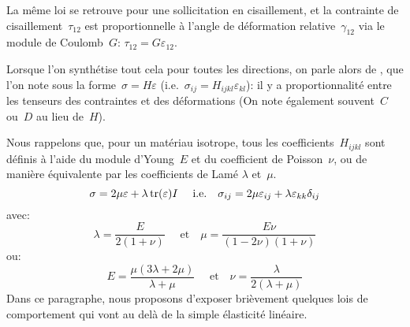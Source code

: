 La même loi se retrouve pour une sollicitation en cisaillement, et la contrainte de cisaillement~$\tau_{12}$
est proportionnelle à l'angle de déformation relative~$\gamma_{12}$ via le module de
Coulomb~$G$:
$\tau_{12}=G\varepsilon_{12}$.

Lorsque l'on synthétise tout cela pour toutes les directions, on parle alors de ,
que l'on note sous la forme~$\sigma=H\varepsilon$ (i.e.~$\sigma_{ij}=H_{ijkl}\varepsilon_{kl}$):
il y a proportionnalité entre les tenseurs des contraintes et des déformations (On note également
souvent~$C$ ou~$D$ au lieu de~$H$).

\medskip
Nous rappelons que, pour un matériau isotrope, tous les coefficients~$H_{ijkl}$ sont définis
à l'aide du module d'Young~$E$
et du coefficient de Poisson~$\nu$,
ou de manière équivalente par les coefficients de Lamé
$\lambda$ et~$\mu$.
\begin{equation}\sigma = 2\mu\varepsilon+\lambda \operatorname{tr}(\varepsilon)I \quad \text{ i.e.} \quad
\sigma_{ij}=2\mu\varepsilon_{ij}+\lambda\varepsilon_{kk}\delta_{ij}\end{equation}
avec:
\begin{equation}\lambda=\dfrac{E}{2(1+\nu)} \quad \text{ et} \quad \mu=\dfrac{E\nu}{(1-2\nu)(1+\nu)} \end{equation}
ou:
\begin{equation}E=\dfrac{\mu(3\lambda+2\mu)}{\lambda+\mu} \quad\text{ et}\quad
\nu=\dfrac{\lambda}{2(\lambda+\mu)} \end{equation}
\medskipvm
Dans ce paragraphe, nous proposons d'exposer brièvement quelques lois de
comportement qui vont au delà de la simple élasticité linéaire.


\medskip

